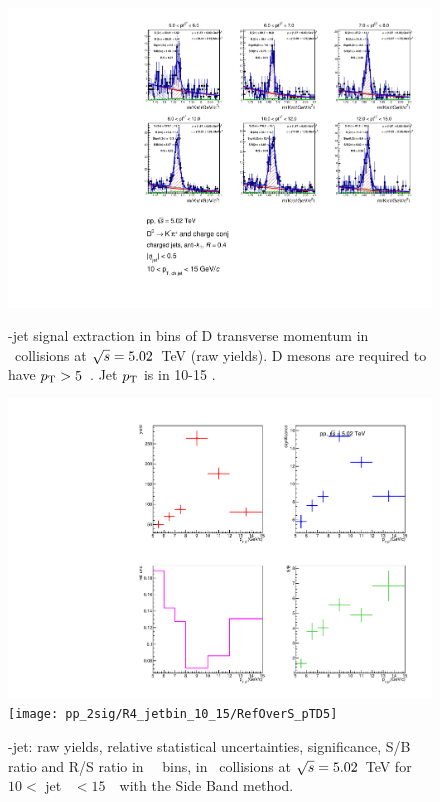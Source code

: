 \begin{figure}[bth]
\centering
\begin{minipage}{.65\textwidth}
  \centering
  \includegraphics[width=\linewidth]{pp_2sig/R4_jetbin_10_15/invMass_pTD5}
\caption{\Dzero-jet signal extraction in bins of D transverse momentum in \pp\ collisions at $\sqrt{s}=5.02$~TeV (raw yields). D mesons are required to have $p_{\rm T}>5$~\GeVc. Jet $p_{\rm T}$ is in 10-15 \GeVc.
}
\label{fig:eq_pp_InvMass_Dzero_10_15_R4}
\end{minipage}%
\begin{minipage}{.4\textwidth}
  \centering
  \includegraphics[width=\linewidth]{pp_2sig/R4_jetbin_10_15/signalParams_pTD5}
  \texttt{[image: pp\_2sig/R4\_jetbin\_10\_15/RefOverS\_pTD5]}
\caption{%
\Dzero-jet: raw yields, relative statistical uncertainties, significance, S/B ratio and R/S ratio in \Dzero\ \pt\ bins, in \pp\ collisions at $\sqrt{s}=5.02$~TeV for $10<$ jet \pt\ $<15$~\GeVc\ with the Side Band method.
}
\label{fig:eq_pp_signalParams_10_15_R4}
\end{minipage}
\end{figure}
